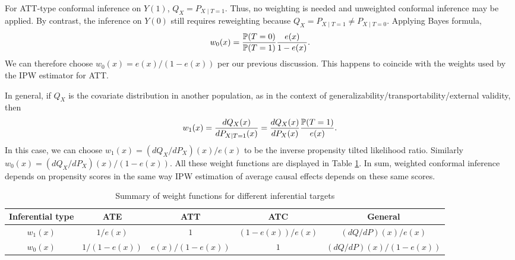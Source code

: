 For ATT-type conformal inference on $Y(1)$, $Q_{X} = P_{X\mid T = 1}$.
Thus, no weighting is needed and unweighted conformal inference may be
applied. By contrast, the inference on $Y(0)$ still requires
reweighting because $Q_X = P_{X\mid T = 1}\not = P_{X\mid T =
  0}$. Applying Bayes formula,
\[w_{0}(x) = \frac{\P(T = 0)}{\P(T = 1)}\frac{e(x)}{1 - e(x)}.\]
We can therefore choose $w_{0}(x) = e(x) / (1 - e(x))$ per our
previous discussion. This happens to coincide with the weights used by
the IPW estimator for ATT.

In general, if $Q_{X}$ is the covariate distribution in another
population, as in the context of
generalizability/transportability/external validity, then 
\[
w_{1}(x) = \frac{dQ_{X}(x)}{dP_{X\mid T = 1}(x)} =
\frac{dQ_{X}(x)}{dP_{X}(x)}\frac{\P(T = 1)}{e(x)}. 
\]
In this case, we can choose $w_{1}(x) = (dQ_{X}/dP_{X})(x) / e(x)$ to
be the inverse propensity tilted likelihood ratio. Similarly
$w_{0}(x) = (dQ_{X}/dP_{X})(x) / (1 - e(x))$. All these weight
functions are displayed in Table \ref{tab:weight_func}. In sum,
weighted conformal inference depends on propensity scores in the same
way IPW estimation of average causal effects depends on these same
scores.

\begin{table}
  \caption{\label{tab:weight_func}Summary of weight functions for different inferential targets}

  \centering
  \begin{tabular}{c|cccc}
    \toprule
    Inferential type & ATE & ATT & ATC & General\\
    \midrule
    $w_{1}(x)$ & $1 / e(x)$ & $1$ & $(1 - e(x)) / e(x)$ & $(dQ/dP)(x) / e(x)$\\
    $w_{0}(x)$ & $1 / (1 - e(x))$ & $e(x) / (1 - e(x))$ & $1$ & $(dQ/dP)(x) / (1 - e(x))$\\
    \bottomrule
  \end{tabular}
\end{table}


